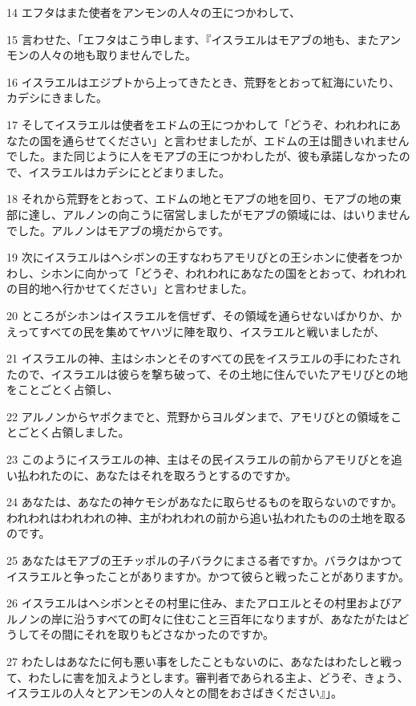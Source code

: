 \par 14 エフタはまた使者をアンモンの人々の王につかわして、
\par 15 言わせた、「エフタはこう申します、『イスラエルはモアブの地も、またアンモンの人々の地も取りませんでした。
\par 16 イスラエルはエジプトから上ってきたとき、荒野をとおって紅海にいたり、カデシにきました。
\par 17 そしてイスラエルは使者をエドムの王につかわして「どうぞ、われわれにあなたの国を通らせてください」と言わせましたが、エドムの王は聞きいれませんでした。また同じように人をモアブの王につかわしたが、彼も承諾しなかったので、イスラエルはカデシにとどまりました。
\par 18 それから荒野をとおって、エドムの地とモアブの地を回り、モアブの地の東部に達し、アルノンの向こうに宿営しましたがモアブの領域には、はいりませんでした。アルノンはモアブの境だからです。
\par 19 次にイスラエルはヘシボンの王すなわちアモリびとの王シホンに使者をつかわし、シホンに向かって「どうぞ、われわれにあなたの国をとおって、われわれの目的地へ行かせてください」と言わせました。
\par 20 ところがシホンはイスラエルを信ぜず、その領域を通らせないばかりか、かえってすべての民を集めてヤハヅに陣を取り、イスラエルと戦いましたが、
\par 21 イスラエルの神、主はシホンとそのすべての民をイスラエルの手にわたされたので、イスラエルは彼らを撃ち破って、その土地に住んでいたアモリびとの地をことごとく占領し、
\par 22 アルノンからヤボクまでと、荒野からヨルダンまで、アモリびとの領域をことごとく占領しました。
\par 23 このようにイスラエルの神、主はその民イスラエルの前からアモリびとを追い払われたのに、あなたはそれを取ろうとするのですか。
\par 24 あなたは、あなたの神ケモシがあなたに取らせるものを取らないのですか。われわれはわれわれの神、主がわれわれの前から追い払われたものの土地を取るのです。
\par 25 あなたはモアブの王チッポルの子バラクにまさる者ですか。バラクはかつてイスラエルと争ったことがありますか。かつて彼らと戦ったことがありますか。
\par 26 イスラエルはヘシボンとその村里に住み、またアロエルとその村里およびアルノンの岸に沿うすべての町々に住むこと三百年になりますが、あなたがたはどうしてその間にそれを取りもどさなかったのですか。
\par 27 わたしはあなたに何も悪い事をしたこともないのに、あなたはわたしと戦って、わたしに害を加えようとします。審判者であられる主よ、どうぞ、きょう、イスラエルの人々とアンモンの人々との間をおさばきください』」。
